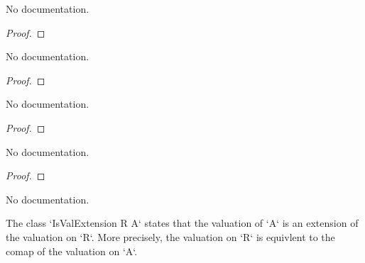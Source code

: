 \begin{theorem}\label{IsValExtension.val_map_lt_iff}
        \leanok
                No documentation.
    \end{theorem}

\begin{proof}
    \leanok
\end{proof}

\begin{theorem}\label{IsValExtension.val_map_eq_iff}
        \leanok
                No documentation.
    \end{theorem}

\begin{proof}
    \leanok
\end{proof}

\begin{theorem}\label{IsValExtension.val_map_le_one_iff}
        \leanok
                No documentation.
    \end{theorem}

\begin{proof}
    \leanok
\end{proof}

\begin{theorem}\label{IsValExtension.val_map_lt_one_iff}
        \leanok
                No documentation.
    \end{theorem}

\begin{proof}
    \leanok
\end{proof}

\begin{theorem}\label{IsValExtension.val_map_eq_one_iff}
                No documentation.
    \end{theorem}

\begin{definition}\label{IsValExtension}
        \leanok
                The class `IsValExtension R A` states that the valuation of `A` is an extension of the valuation
on `R`. More precisely, the valuation on `R` is equivlent to the comap of the valuation on `A`.
    \end{definition}

